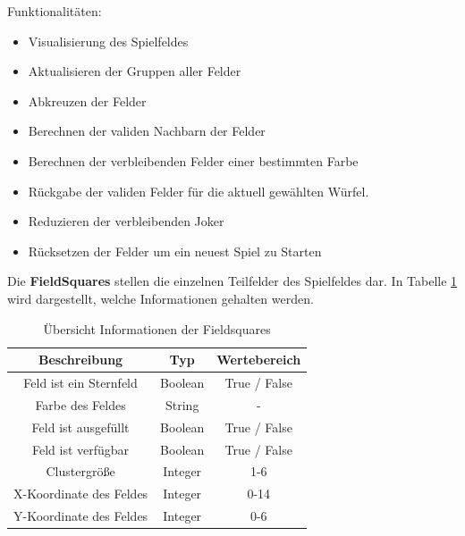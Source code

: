 Funktionalitäten:
\begin{itemize}
	\item  Visualisierung des Spielfeldes
    \item  Aktualisieren der Gruppen aller Felder
    \item  Abkreuzen der Felder
    \item  Berechnen der validen Nachbarn der Felder
    \item  Berechnen der verbleibenden Felder einer bestimmten Farbe
    \item  Rückgabe der validen Felder für die aktuell gewählten Würfel.
    \item  Reduzieren der verbleibenden Joker
    \item  Rücksetzen der Felder um ein neuest Spiel zu Starten
\end{itemize}

Die \textbf{FieldSquares} stellen die einzelnen Teilfelder des Spielfeldes dar. In Tabelle \ref{tab:Informationen in FieldSquares} wird dargestellt, welche Informationen gehalten werden.
\begin{table}[htbp]
    \centering
    \begin{tabular}{|c|c|c|}
    \hline
    \textbf{Beschreibung} & \textbf{Typ} & \textbf{Wertebereich} \\
    \hline
    Feld ist ein Sternfeld & Boolean & True / False \\
    \hline
    Farbe des Feldes & String & - \\
    \hline
    Feld ist ausgefüllt & Boolean & True / False \\
    \hline
    Feld ist verfügbar & Boolean & True / False \\
    \hline
    Clustergröße & Integer & 1-6 \\
    \hline
    X-Koordinate des Feldes & Integer & 0-14 \\
    \hline
    Y-Koordinate des Feldes & Integer & 0-6 \\
    \hline
    \end{tabular}
    \caption{Übersicht Informationen der Fieldsquares}
    \label{tab:Informationen in FieldSquares}
\end{table}

